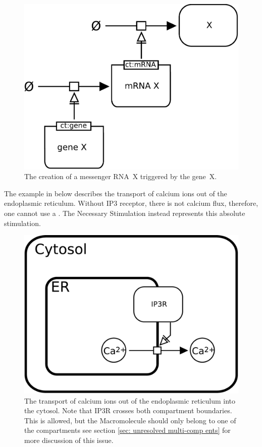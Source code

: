 \begin{figure}[H]
  \centering
  \includegraphics[scale = 0.4]{examples/necessary_stim-genetic}
  \caption{The creation of a messenger RNA~X triggered by the gene~X.}
  \label{fig:necessary_stim-gene}
\end{figure}


The example in  below describes the transport of calcium ions out of the endoplasmic reticulum. Without IP3 receptor, there is not calcium flux, therefore, one cannot use a . The Necessary Stimulation instead represents this absolute stimulation.

\begin{figure}[H]
  \centering
  \includegraphics[scale = 0.3]{examples/necessary_stim-transport}
  \caption{The transport of calcium ions out of the endoplasmic reticulum into the cytosol. Note that IP3R crosses both compartment boundaries. This is allowed, but the Macromolecule should only belong to one of the compartments see section \ref{sec: unresolved multi-comp ents} for more discussion of this issue.}
  \label{fig:necessary_stim-calcium}
\end{figure}

